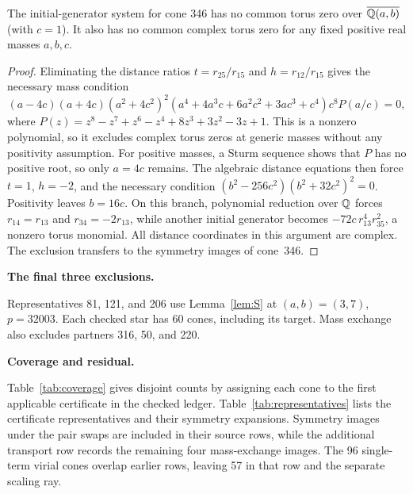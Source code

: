\documentclass[11pt]{amsart}
\newcommand{\topic}[1]{\par\addvspace{1.4ex}\noindent\textbf{#1}\par\nobreak\smallskip\noindent}
\theoremstyle{definition}\newtheorem{definition}[theorem]{Definition}\theoremstyle{remark}\newtheorem{remark}[theorem]{Remark}
\begin{document}
\begin{lemma}\label{lem:companion346}
The initial-generator system for cone 346 has no common torus zero over $\overline{\mathbb{Q}(a,b)}$ (with $c=1$). It also has no common complex torus zero for any fixed positive real masses $a,b,c$.
\end{lemma}
\begin{proof}
Eliminating the distance ratios $t=r_{25}/r_{15}$ and $h=r_{12}/r_{15}$ gives the necessary mass condition
\[
 (a-4c)(a+4c)(a^2+4c^2)^2
 (a^4+4a^3c+6a^2c^2+3ac^3+c^4)c^8 P(a/c)=0,
\]
where $P(z)=z^8-z^7+z^6-z^4+8z^3+3z^2-3z+1$.
This is a nonzero polynomial, so it excludes complex torus zeros at generic masses without any positivity assumption. For positive masses, a Sturm sequence shows that $P$ has no positive root, so only $a=4c$ remains. The algebraic distance equations then force $t=1$, $h=-2$, and the necessary condition $(b^2-256c^2)(b^2+32c^2)^2=0$. Positivity leaves $b=16c$. On this branch, polynomial reduction over $\mathbb{Q}$ forces $r_{14}=r_{13}$ and $r_{34}=-2r_{13}$, while another initial generator becomes $-72c\,r_{13}^4r_{35}^2$, a nonzero torus monomial. All distance coordinates in this argument are complex. The exclusion transfers to the symmetry images of cone~346.
\end{proof}

\topic{The final three exclusions.} Representatives 81, 121, and 206 use Lemma~\ref{lem:S} at $(a,b)=(3,7)$, $p=32003$. Each checked star has 60 cones, including its target. Mass exchange also excludes partners 316, 50, and 220.

\topic{Coverage and residual.} Table~\ref{tab:coverage} gives disjoint counts by assigning each cone to the first applicable certificate in the checked ledger. Table~\ref{tab:representatives} lists the certificate representatives and their symmetry expansions. Symmetry images under the pair swaps are included in their source rows, while the additional transport row records the remaining four mass-exchange images. The 96 single-term virial cones overlap earlier rows, leaving 57 in that row and the separate scaling ray.
\end{document}
